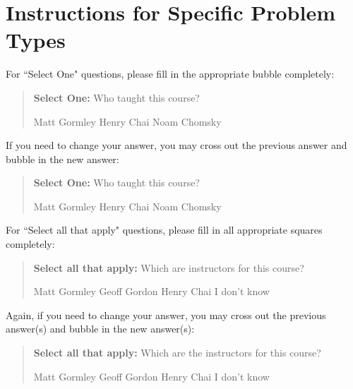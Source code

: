\documentclass[11pt,addpoints,answers]{exam}
\newcommand{\blackcircle}{\tikz\draw[black,fill=black] (0,0) circle (1ex);}
\begin{document}
    \clearpage
    
\section*{Instructions for Specific Problem Types}

For ``Select One" questions, please fill in the appropriate bubble completely:

\begin{quote}
\textbf{Select One:} Who taught this course?
    \begin{checkboxes}
     \CorrectChoice Matt Gormley
     \choice Henry Chai
     \choice Noam Chomsky
    \end{checkboxes}
\end{quote}

If you need to change your answer, you may cross out the previous answer and bubble in the new answer:

\begin{quote}
\textbf{Select One:} Who taught this course?
    {
    \begin{checkboxes}
     \CorrectChoice Matt Gormley
     \choice Henry Chai \checkboxchar{\xcancel{\blackcircle}{}}
     \choice Noam Chomsky
    \end{checkboxes}
    }
\end{quote}

For ``Select all that apply" questions, please fill in all appropriate squares completely:

\begin{quote}
\textbf{Select all that apply:} Which are instructors for this course?
    {%
    \checkboxchar{$\Box$} \checkedchar{$\blacksquare$} %
    \begin{checkboxes}
    \CorrectChoice Matt Gormley  
    \CorrectChoice Geoff Gordon
    \choice Henry Chai
    \choice I don't know
    \end{checkboxes}
    }
\end{quote}

Again, if you need to change your answer, you may cross out the previous answer(s) and bubble in the new answer(s):

\begin{quote}
\textbf{Select all that apply:} Which are the instructors for this course?
    {%
    \checkboxchar{\xcancel{$\blacksquare$}} \checkedchar{$\blacksquare$} %
    \begin{checkboxes}
    \CorrectChoice Matt Gormley 
    \CorrectChoice Geoff Gordon
    \choice Henry Chai
    \choice I don't know
    \end{checkboxes}
    }
\end{quote}
\end{document}
